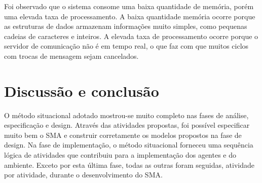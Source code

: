 \documentclass{llncs}
\begin{document}
Foi observado que o sistema consome uma baixa quantidade de memória, porém uma elevada taxa de processamento. A baixa quantidade memória ocorre porque as estruturas de dados armazenam informações muito simples, como pequenas cadeias de caracteres e inteiros. A elevada taxa de processamento ocorre porque o servidor de comunicação não é em tempo real, o que faz com que muitos ciclos com trocas de mensagem sejam cancelados.

\section{Discussão e conclusão}



O método situacional adotado mostrou-se muito completo nas fases de análise, especificação e design. Através das atividades propostas, foi possível especificar muito bem o SMA e construir corretamente os modelos propostos na fase de design. Na fase de implementação, o método situacional forneceu uma sequência lógica de atividades que contribuiu para a implementação dos agentes e do ambiente. Exceto por esta última fase, todas as outras foram seguidas, atividade por atividade, durante o desenvolvimento do SMA.
\end{document}
